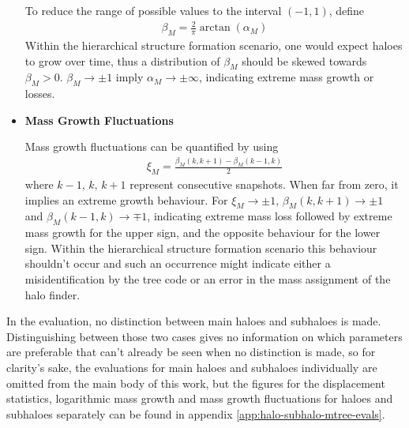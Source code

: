 \begin{itemize}
		To reduce the range of possible values to the interval $(-1, 1)$, \cite{SUSSING_CONVERGENCE} define
		\begin{align}
			\beta_M = \frac{2}{\pi}\arctan(\alpha_M) \label{eq:massgrowth}
		\end{align}
		Within the hierarchical structure formation scenario, one would expect haloes to grow over time, thus a distribution of $\beta_M$ should be skewed towards $\beta_M > 0$.
        $\beta_M \rightarrow \pm 1$ imply $\alpha_M \rightarrow \pm \infty$, indicating extreme mass growth or losses.\\
		
	\item \textbf{Mass Growth Fluctuations}
		
		Mass growth fluctuations can be quantified by using
		\begin{align}
			\xi_M = \frac{\beta_M(k, k+1) - \beta_M(k-1, k)}{2} \label{eq:massfluct}
		\end{align}
		where $k-1$, $k$, $k+1$ represent consecutive snapshots.
		When far from zero, it implies an extreme growth behaviour. 
        For $\xi_M\rightarrow \pm 1$, $\beta_M(k, k+1) \rightarrow \pm 1$ and $\beta_M(k-1, k) \rightarrow \mp 1$, indicating extreme mass loss followed by extreme mass growth for the upper sign, and the opposite behaviour for the lower sign.
		Within the hierarchical structure formation scenario this behaviour shouldn't occur and such an occurrence might indicate either a misidentification by the tree code or an error in the mass assignment of the halo finder.
\end{itemize}







In the evaluation, no distinction between main haloes and subhaloes is made.
Distinguishing between those two cases gives no information on which parameters are preferable that can't already be seen when no distinction is made, so for clarity's sake, the evaluations for main haloes and subhaloes individually are omitted from the main body of this work, but the figures for the displacement statistics, logarithmic mass growth and mass growth fluctuations for haloes and subhaloes separately can be found in appendix \ref{app:halo-subhalo-mtree-evals}.
















